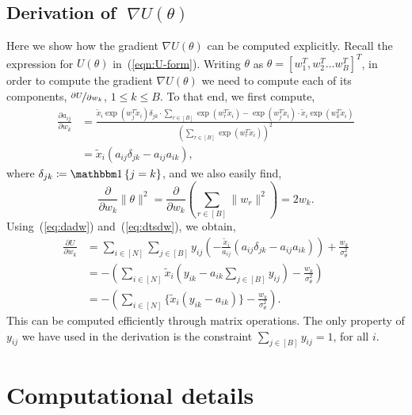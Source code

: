 \subsection{Derivation of {\boldmath $\;\nabla U(\theta)$}}
\label{appdx:gradu}
Here we show how the gradient 
$\nabla U(\theta)$ can be computed explicitly.
Recall the expression for $U(\theta)$ in~(\ref{eqn:U-form}).
Writing $\theta$ as
$\theta = \left[w_1^T, w_2^T \dots w_B^T  \right]^T$,
in order to compute the gradient
$\nabla U(\theta)$ we need to compute
each of its components,
$\nicefrac{\partial U}{\partial w_k}$,
$1\leq k\leq B$.
To that end, we first compute,
%
\begin{align}
	\frac{\partial a_{ij}}{\partial w_k} &= \frac
	{\tilde{x}_i \exp(w_j^T \tilde{x}_i) \delta_{jk} \cdot \sum_{r \in [B]} \exp(w_r^T \tilde{x}_i) 
		- 
		\exp(w_j^T \tilde{x}_i) \cdot \tilde{x}_i \exp(w_k^T \tilde{x}_i)}
	{\left( \sum_{r \in [B]} \exp(w_r^T \tilde{x}_i) \right)^2} \nonumber \\
	&= \tilde{x}_i \left( a_{ij} \delta_{jk} - a_{ij}a_{ik} \right), 
	\label{eq:dadw}
\end{align}
%
where $\delta_{jk} \coloneqq \one \left\{ j = k \right\}$,
and we also easily find,
%
\begin{equation}
	\frac{ \partial}{\partial w_k} \|\theta\|^2 = \frac{\partial}{\partial w_k} \left( \sum_{r \in [B]} \|w_r\|^2 \right) = 2w_k.
\label{eq:dtsdw}
\end{equation}
%
Using~(\ref{eq:dadw}) and~(\ref{eq:dtsdw}), we obtain,
\begin{align}
	\frac{\partial U}{\partial w_k} &= 
	\sum_{i \in [N]} \sum_{j \in [B]} y_{ij} 
	\left( -\frac{\tilde{x}_i}{a_{ij}} \left( a_{ij} \delta_{jk} - a_{ij} a_{ik} \right) \right)
	+ \frac{w_k}{\sigma_\theta^2} \nonumber \\
	&=  - \left( \sum_{i \in [N]} \tilde{x}_i \left( y_{ik} - a_{ik} \sum_{j \in [B]} y_{ij} \right)
	- \frac{w_k}{\sigma_\theta^2} \right) \nonumber \\
	&= - \left( \sum_{i \in [N]} \Big\{ \tilde{x}_i (y_{ik} - a_{ik}) \Big\} - \frac{w_k}{\sigma_\theta^2} \right).
\end{align}
%
This can be computed 
efficiently through matrix operations. The only property of $y_{ij}$ 
we have used in the derivation is the constraint $\sum_{j \in [B]} y_{ij} = 1$,
for all $i$.

\clearpage
\section{Computational details}

